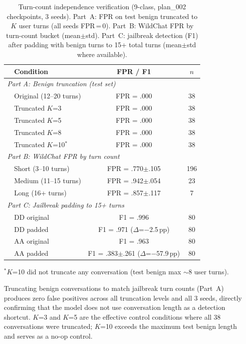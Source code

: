 \begin{table}[ht]
\centering
\footnotesize
\caption{Turn-count independence verification (9-class, plan\_002 checkpoints, 3 seeds). Part~A: FPR on test benign truncated to $K$ user turns (all seeds FPR\,=\,0). Part~B: WildChat FPR by turn-count bucket (mean$\pm$std). Part~C: jailbreak detection (F1) after padding with benign turns to 15+ total turns (mean$\pm$std where available).}
\label{tab:length_independence}
\begin{tabular}{@{}llcc@{}}
\toprule
& \textbf{Condition} & \textbf{FPR / F1} & $n$ \\
\midrule
\multicolumn{4}{l}{\textit{Part A: Benign truncation (test set)}} \\[2pt]
& Original (12--20 turns) & FPR = .000 & 38 \\
& Truncated $K$=3 & FPR = .000 & 38 \\
& Truncated $K$=5 & FPR = .000 & 38 \\
& Truncated $K$=8 & FPR = .000 & 38 \\
& Truncated $K$=10$^{*}$ & FPR = .000 & 38 \\
\midrule
\multicolumn{4}{l}{\textit{Part B: WildChat FPR by turn count}} \\[2pt]
& Short (3--10 turns) & FPR = .770$\pm$.105 & 196 \\
& Medium (11--15 turns) & FPR = .942$\pm$.054 & 23 \\
& Long (16+ turns) & FPR = .857$\pm$.117 & 7 \\
\midrule
\multicolumn{4}{l}{\textit{Part C: Jailbreak padding to 15+ turns}} \\[2pt]
& DD original & F1 = .996 & 80 \\
& DD padded & F1 = .971 ($\Delta$=$-$2.5\,pp) & 80 \\
& AA original & F1 = .963 & 80 \\
& AA padded & F1 = .383$\pm$.261 ($\Delta$=$-$57.9\,pp) & 80 \\
\bottomrule
\end{tabular}
\vspace{-2pt}
{\footnotesize $^{*}$$K$=10 did not truncate any conversation (test benign max $\sim$8 user turns).}
\end{table}

Truncating benign conversations to match jailbreak turn counts (Part~A) produces zero false positives across all truncation levels and all 3 seeds, directly confirming that the model does not use conversation length as a detection shortcut. $K$=3 and $K$=5 are the effective control conditions where all 38 conversations were truncated; $K$=10 exceeds the maximum test benign length and serves as a no-op control.

